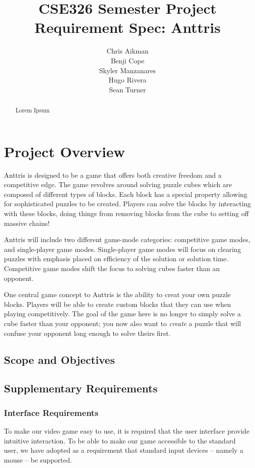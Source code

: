 \documentclass[12pt]{article}
\begin{document}
\title{CSE326 Semester Project Requirement Spec: Anttris}
\author{Chris Aikman\\Benji Cope\\Skyler Manzanares\\Hugo Rivera\\Sean Turner}
\maketitle
\begin{abstract}
Lorem Ipsum
\end{abstract}
\section{Project Overview}
Anttris is designed to be a game that offers both creative freedom and a competitive edge. The game revolves around solving puzzle cubes which are composed of different types of blocks. Each block has a special property allowing for sophisticated puzzles to be created. Players can solve the blocks by interacting with these blocks, doing things from removing blocks from the cube to setting off massive chains!

Anttris will include two different game-mode categories: competitive game modes, and single-player game modes. Single-player game modes will focus on clearing puzzles with emphasis placed on efficiency of the solution or solution time. Competitive game modes shift the focus to solving cubes faster than an opponent.

One central game concept to Anttris is the ability to creat your own puzzle blocks. Players will be able to create custom blocks that they can use when playing competitively. The goal of the game here is no longer to simply solve a cube faster than your opponent; you now also want to \textsl{create} a puzzle that will confuse your opponent long enough to solve theirs first.
\subsection{Scope and Objectives}
\subsection{Supplementary Requirements}
\subsubsection{Interface Requirements}
To make our video game easy to use, it is required that the user interface 
provide intuitive interaction. To be able to make our game accessible to 
the standard user, we have adopted as a requirement that standard 
input devices -- namely a mouse -- be supported.
\end{document}
